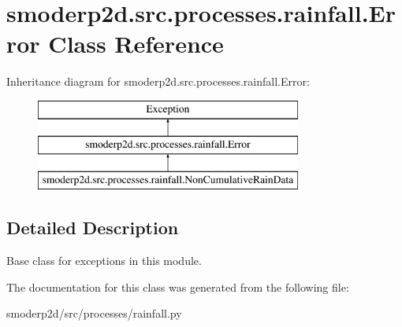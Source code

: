 \hypertarget{classsmoderp2d_1_1src_1_1processes_1_1rainfall_1_1Error}{\section{smoderp2d.\-src.\-processes.\-rainfall.\-Error Class Reference}
\label{classsmoderp2d_1_1src_1_1processes_1_1rainfall_1_1Error}
}
Inheritance diagram for smoderp2d.\-src.\-processes.\-rainfall.\-Error\-:\begin{figure}[H]
\begin{center}
\leavevmode
\includegraphics[height=3.000000cm]{classsmoderp2d_1_1src_1_1processes_1_1rainfall_1_1Error}
\end{center}
\end{figure}


\subsection{Detailed Description}
\begin{DoxyVerb}Base class for exceptions in this module.\end{DoxyVerb}
 

The documentation for this class was generated from the following file\-:\begin{DoxyCompactItemize}
\item 
smoderp2d/src/processes/rainfall.\-py\end{DoxyCompactItemize}
